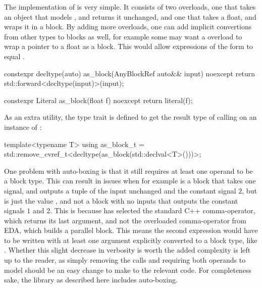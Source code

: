 The implementation of  is very simple. It consists of two overloads, one that takes an
object that models , and returns it unchanged, and one that takes a float, and wraps
it in a  block. By adding more  overloads, one can add implicit convertions from other types to
blocks as well, for example some may want a  overload to wrap a pointer to a float as a  block. This would allow expressions
of the form  to equal .

\begin{cppcodenl}
  constexpr decltype(auto) as_block(AnyBlockRef auto&& input) noexcept
  {
    return std::forward<decltype(input)>(input);
  }

  constexpr Literal as_block(float f) noexcept
  {
    return literal(f);
  }
\end{cppcodenl}

As an extra utility, the  type trait is defined to get the result type of calling  on an instance of :

\begin{cppcodenl}
  template<typename T>
  using as_block_t = std::remove_cvref_t<decltype(as_block(std::declval<T>()))>;
\end{cppcodenl}

One problem with auto-boxing is that it still requires at least one operand to be a block type. This can
result in issues when for example  is a block that takes one signal, and outputs a
tuple of the input unchanged and the constant signal $2$, but
 is just the value , and not a block with no inputs that outputs the constant signals
$1$ and $2$. This is because  has selected the
standard C++ comma-operator, which returns its last argument, and not the overloaded comma-operator from EDA,
which builds a parallel block. This means the second expression would have to be written with at least one
argument explicitly converted to a block type, like .  Whether this slight decrease in
verbosity is worth the added complexity is left up to the reader, as simply removing the
 calls and requiring both operands to model  should be an easy
change to make to the relevant code. For completeness sake, the library as described here includes
auto-boxing.


